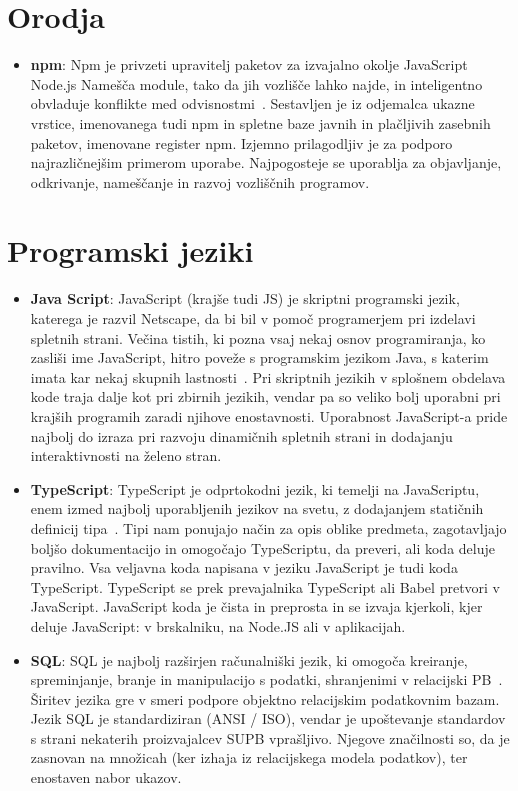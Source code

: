 \documentclass[a4paper, 12pt]{book}
\begin{document}
\section{Orodja}
 \begin{itemize}
  \item \textbf{npm}: Npm je privzeti upravitelj paketov za izvajalno okolje JavaScript Node.js Namešča module, tako da jih vozlišče lahko najde, in inteligentno obvladuje konflikte med odvisnostmi~\cite{npm}. Sestavljen je iz odjemalca ukazne vrstice, imenovanega tudi npm in spletne baze javnih in plačljivih zasebnih paketov, imenovane register npm. Izjemno prilagodljiv je za podporo najrazličnejšim primerom uporabe. Najpogosteje se uporablja za objavljanje, odkrivanje, nameščanje in razvoj vozliščnih programov.
  \end{itemize}

\section{Programski jeziki}
 \begin{itemize}
  \item \textbf{Java Script}: JavaScript (krajše tudi JS) je skriptni programski jezik, katerega je razvil Netscape, da bi bil v pomoč programerjem pri izdelavi spletnih strani. Večina tistih, ki pozna vsaj nekaj osnov programiranja, ko zasliši ime JavaScript, hitro poveže s programskim jezikom Java, s katerim imata kar nekaj skupnih lastnosti~\cite{JS}. Pri skriptnih jezikih v splošnem obdelava kode traja dalje kot pri zbirnih jezikih, vendar pa so veliko bolj uporabni pri krajših programih zaradi njihove enostavnosti. Uporabnost JavaScript-a pride najbolj do izraza pri razvoju dinamičnih spletnih strani in dodajanju interaktivnosti na želeno stran.
  
  \item \textbf{TypeScript}: TypeScript je odprtokodni jezik, ki temelji na JavaScriptu, enem izmed najbolj uporabljenih jezikov na svetu, z dodajanjem statičnih definicij tipa~\cite{TS}. Tipi nam ponujajo način za opis oblike predmeta, zagotavljajo boljšo dokumentacijo in omogočajo TypeScriptu, da preveri, ali koda deluje pravilno.
Vsa veljavna koda napisana v jeziku JavaScript je tudi koda TypeScript. TypeScript se prek prevajalnika TypeScript ali Babel pretvori v JavaScript. JavaScript koda je čista in preprosta in se izvaja kjerkoli, kjer deluje JavaScript: v brskalniku, na Node.JS ali v aplikacijah.
  
  \item \textbf{SQL}: SQL je najbolj razširjen računalniški jezik, ki omogoča kreiranje, spreminjanje, branje in manipulacijo s podatki, shranjenimi v relacijski PB~\cite{SQL}. Širitev jezika gre v smeri podpore objektno relacijskim podatkovnim bazam. Jezik SQL je standardiziran (ANSI / ISO), vendar je upoštevanje standardov s strani nekaterih proizvajalcev SUPB vprašljivo. Njegove značilnosti so, da je zasnovan na množicah (ker izhaja iz relacijskega modela podatkov), ter enostaven nabor ukazov.
\end{itemize}
\end{document}
